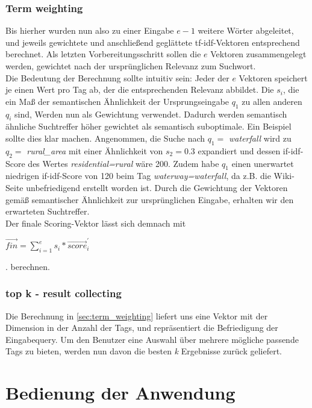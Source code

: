 \documentclass[12pt,pdftex,a4paper]{article}
\begin{document}
\subsubsection{Term weighting}\label{sec:term_weighting}
Bis hierher wurden nun also zu einer Eingabe $e-1$ weitere Wörter abgeleitet, und jeweils gewichtete und anschließend geglättete tf-idf-Vektoren entsprechend berechnet. Als letzten Vorbereitungsschritt sollen die $e$ Vektoren zusammengelegt werden, gewichtet nach der ursprünglichen Relevanz zum Suchwort.\\
Die Bedeutung der Berechnung sollte intuitiv sein: Jeder der $e$ Vektoren speichert je einen Wert pro Tag ab, der die entsprechenden Relevanz abbildet. Die $s_i$, die ein Maß der semantischen Ähnlichkeit der Ursprungseingabe $q_1$ zu allen anderen $q_i$ sind, Werden nun als Gewichtung verwendet. Dadurch werden semantisch ähnliche Suchtreffer höher gewichtet als semantisch suboptimale. Ein Beispiel sollte dies klar machen. Angenommen, die Suche nach $q_1 =$ \textit{waterfall} wird zu $q_2 =$ \textit{rural\_area} mit einer Ähnlichkeit von  $s_2 = 0.3$ expandiert und dessen if-idf-Score des Wertes \textit{residential=rural} wäre 200. Zudem habe $q_1 $ einen unerwartet niedrigen if-idf-Score von 120 beim Tag \textit{waterway=waterfall}, da z.B. die Wiki-Seite unbefriedigend erstellt worden ist. Durch die Gewichtung der Vektoren gemäß semantischer Ähnlichkeit zur ursprünglichen Eingabe, erhalten wir den erwarteten Suchtreffer.\\
Der finale Scoring-Vektor lässt sich demnach mit\\
\begin{center}
	$\vec{fin} = \sum_{i=1}^{e} s_i * \vec{score}_{i}^{'}$
\end{center}.
berechnen.


\subsubsection{top k - result collecting}
Die Berechnung in \autoref{sec:term_weighting} liefert uns eine Vektor mit der Dimension in der Anzahl der Tags, und repräsentiert die Befriedigung der Eingabequery. Um den Benutzer eine Auswahl über mehrere mögliche passende Tags zu bieten, werden nun davon die besten \textit{k} Ergebnisse zurück geliefert.

\section{Bedienung der Anwendung}
\end{document}
